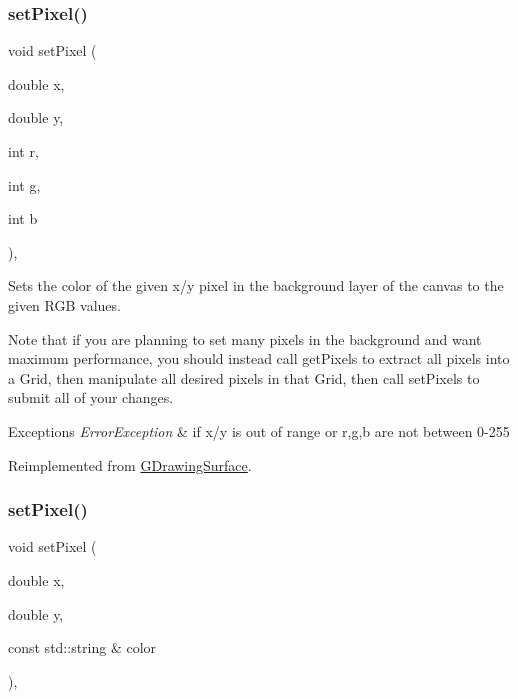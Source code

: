 \subsubsection{\texorpdfstring{set\+Pixel()}{setPixel()}\hspace{0.1cm}{\footnotesize\ttfamily [2/3]}}
{\footnotesize\ttfamily void set\+Pixel (\begin{DoxyParamCaption}\item[{double}]{x,  }\item[{double}]{y,  }\item[{int}]{r,  }\item[{int}]{g,  }\item[{int}]{b }\end{DoxyParamCaption})\hspace{0.3cm}{\ttfamily [override]}, {\ttfamily [virtual]}}



Sets the color of the given x/y pixel in the background layer of the canvas to the given R\+GB values. 

Note that if you are planning to set many pixels in the background and want maximum performance, you should instead call get\+Pixels to extract all pixels into a Grid, then manipulate all desired pixels in that Grid, then call set\+Pixels to submit all of your changes.


\begin{DoxyExceptions}{Exceptions}
{\em Error\+Exception} & if x/y is out of range or r,g,b are not between 0-\/255 \\
\hline
\end{DoxyExceptions}


Reimplemented from \mbox{\hyperlink{classGDrawingSurface_aec90e927c9da286214908d3f9da685d7}{G\+Drawing\+Surface}}.

\mbox{\label{classGDrawingSurface_a09f9640e4ff7388dcfc391efd88d2415}} 
\subsubsection{\texorpdfstring{set\+Pixel()}{setPixel()}\hspace{0.1cm}{\footnotesize\ttfamily [3/3]}}
{\footnotesize\ttfamily void set\+Pixel (\begin{DoxyParamCaption}\item[{double}]{x,  }\item[{double}]{y,  }\item[{const std\+::string \&}]{color }\end{DoxyParamCaption})\hspace{0.3cm}{\ttfamily [virtual]}, {\ttfamily [inherited]}}



